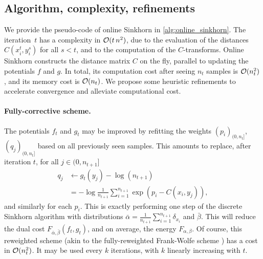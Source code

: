 \subsection{Algorithm, complexity, refinements}

We provide the pseudo-code of online Sinkhorn in \autoref{alg:online_sinkhorn}.
The iteration~$t$ has a complexity in $\mathcal{O}(t\,n^2)$, due to the evaluation of
the distances $C(x_i^t, y_i^s)$ for all $s < t$, and to the computation of the
$C$-transforms. Online Sinkhorn constructs the distance matrix $C$ on the fly,
parallel to updating the potentials $f$ and $g$. In total, its computation cost
after seeing $n_t$ samples is $\mathcal{O}(n_t^2)$, and its memory cost is $\mathcal{O}(n_t)$.
We propose some heuristic refinements to accelerate convergence and alleviate
computational cost.


\paragraph{Fully-corrective scheme.} The potentials $f_t$ and $g_t$ may be
improved by refitting the weights $(p_i)_{(0, n_t]}$, $(q_j)_{(0, n_t]}$ based
on all previously seen samples. This
amounts to replace, after iteration $t$, for all $j \in (0, n_{t+1}]$
\begin{align}
    q_j &\gets g_t(y_j) - \log(n_{t+1}) \\
    &= - \log \frac{1}{n_{t+1}} 
    \sum_{i=1}^{n_{t+1}} \exp(p_i - C(x_i, y_j)),
\end{align}
and similarly for each $p_i$. This is exactly performing one step of the
 discrete Sinkhorn algorithm with distributions $\bar \alpha =
 \frac{1}{n_{t+1}}\sum_{i=1}^{n_{t+1}} \delta_{x_i}$ and $\bar \beta$. This will
 reduce the dual cost $F_{ \bar \alpha, \bar \beta}(f_t, g_t)$, and on average,
 the energy $F_{\alpha, \beta}$. Of course, this reweighted
 scheme (akin to the fully-reweighted Frank-Wolfe scheme \cite{}) has a cost in
 $\mathcal{O}(n_t^2)$. It may be used every $k$ iterations, with $k$ linearly increasing with $t$.

